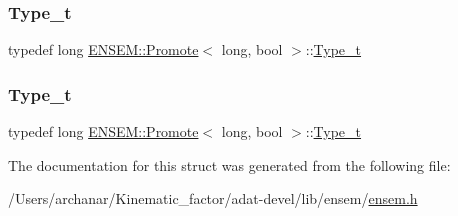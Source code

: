 \subsubsection{\texorpdfstring{Type\_t}{Type\_t}\hspace{0.1cm}{\footnotesize\ttfamily [2/3]}}
{\footnotesize\ttfamily typedef long \mbox{\hyperlink{structENSEM_1_1Promote}{E\+N\+S\+E\+M\+::\+Promote}}$<$ long, bool $>$\+::\mbox{\hyperlink{structENSEM_1_1Promote_3_01long_00_01bool_01_4_aa60bf905b8b32da5f453ddcc2d32f24e}{Type\+\_\+t}}}

\mbox{\label{structENSEM_1_1Promote_3_01long_00_01bool_01_4_aa60bf905b8b32da5f453ddcc2d32f24e}} 
\subsubsection{\texorpdfstring{Type\_t}{Type\_t}\hspace{0.1cm}{\footnotesize\ttfamily [3/3]}}
{\footnotesize\ttfamily typedef long \mbox{\hyperlink{structENSEM_1_1Promote}{E\+N\+S\+E\+M\+::\+Promote}}$<$ long, bool $>$\+::\mbox{\hyperlink{structENSEM_1_1Promote_3_01long_00_01bool_01_4_aa60bf905b8b32da5f453ddcc2d32f24e}{Type\+\_\+t}}}



The documentation for this struct was generated from the following file\+:\begin{DoxyCompactItemize}
\item 
/\+Users/archanar/\+Kinematic\+\_\+factor/adat-\/devel/lib/ensem/\mbox{\hyperlink{adat-devel_2lib_2ensem_2ensem_8h}{ensem.\+h}}\end{DoxyCompactItemize}
